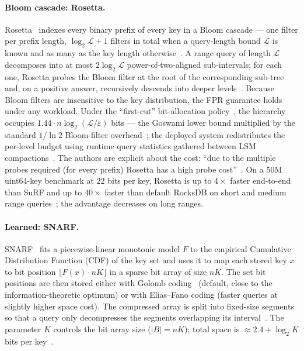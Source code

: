 \paragraph{Bloom cascade: Rosetta.}
\label{par:rosetta}
Rosetta~\citep{luo2020rosetta} indexes every binary prefix of every
key in a Bloom cascade --- one filter per prefix length,
$\log_2 \mathcal{L} + 1$ filters in total when a query-length bound
$\mathcal{L}$ is known and as many as the key length
otherwise~\citep[\S2.1, \S3.1]{luo2020rosetta}. A range query of
length $\mathcal{L}$ decomposes into at most $2 \log_2 \mathcal{L}$
power-of-two-aligned sub-intervals; for each one, Rosetta probes the Bloom filter at
the root of the corresponding sub-tree and, on a positive answer,
recursively descends into deeper
levels~\citep[\S2.2.1]{luo2020rosetta}. Because Bloom filters are
insensitive to the key distribution, the FPR guarantee holds under
any workload.
Under the ``first-cut'' bit-allocation
policy~\citep[\S2.3]{luo2020rosetta}, the hierarchy occupies
$1.44 \cdot n \log_2(\mathcal{L}/\varepsilon)$ bits --- the Goswami
lower bound multiplied by the standard $1/\ln 2$ Bloom-filter
overhead~\citep[\S3.1]{luo2020rosetta}; the deployed system
redistributes the per-level budget using runtime query statistics
gathered between LSM compactions~\citep[\S2.4]{luo2020rosetta}.
The authors are explicit about the cost: ``due to the multiple
probes required (for every prefix) Rosetta has a high probe
cost''~\citep[\S2]{luo2020rosetta}. On a $50$M uint64-key benchmark
at $22$ bits per key, Rosetta is up to $4\times$ faster end-to-end
than SuRF and up to $40\times$ faster than default RocksDB on short
and medium range queries~\citep[\S5, Fig.~5(A1), (D)]{luo2020rosetta};
the advantage decreases on long ranges.

\paragraph{Learned: SNARF.}
SNARF~\citep{vaidya2022snarf} fits a piecewise-linear monotonic
model $F$ to the empirical Cumulative Distribution Function (CDF) of
the key set and uses it to map each stored key $x$ to bit position
$\lfloor F(x) \cdot nK \rfloor$ in a sparse bit array of size $nK$.
The set bit positions are then stored either with
Golomb coding~\citep{golomb1966runlength} (default, close to the
information-theoretic optimum) or with Elias--Fano coding (faster queries at slightly
higher space cost).
The compressed array is split into fixed-size
segments so that a query only decompresses the segments overlapping
its interval~\citep[\S2.3.2]{vaidya2022snarf}.
The parameter $K$ controls the bit array size ($|B| = nK$); total
space is $\approx 2.4 + \log_2 K$ bits per
key~\citep[\S3]{vaidya2022snarf}.

